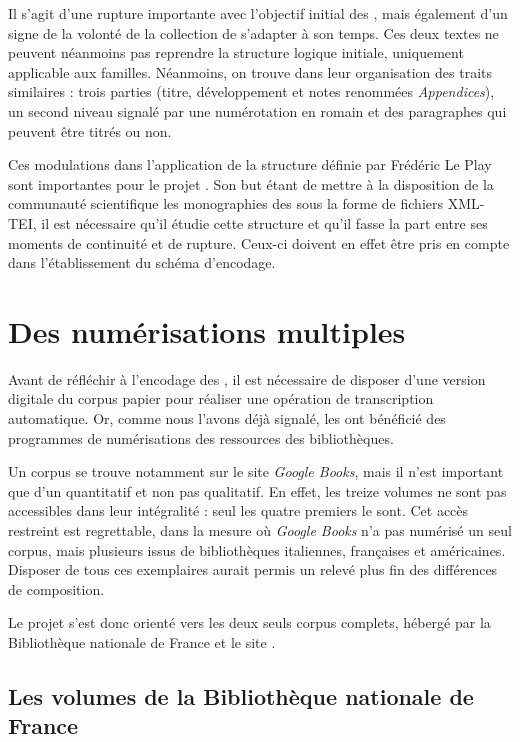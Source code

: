 Il s'agit d'une rupture importante avec l'objectif initial des \odm, mais également d'un signe de la volonté de la collection de s'adapter à son temps. Ces deux textes ne peuvent néanmoins pas reprendre la structure logique initiale, uniquement applicable aux familles. Néanmoins, on trouve dans leur organisation des traits similaires : trois parties (titre, développement et notes renommées \textit{Appendices}), un second niveau signalé par une numérotation en romain et des paragraphes qui peuvent être titrés ou non.

Ces modulations dans l'application de la structure définie par Frédéric Le Play sont importantes pour le projet \timeus. Son but étant de mettre à la disposition de la communauté scientifique les monographies des \odm{} sous la forme de fichiers XML-TEI, il est nécessaire qu'il étudie cette structure et qu'il fasse la part entre ses moments de continuité et de rupture. Ceux-ci doivent en effet être pris en compte dans l'établissement du schéma d'encodage.

\chapter{Des numérisations multiples}

Avant de réfléchir à l'encodage des \odm, il est nécessaire de disposer d'une version digitale du corpus \og papier \fg{} pour réaliser une opération de transcription automatique. Or, comme nous l'avons déjà signalé, les \odm{} ont bénéficié des programmes de numérisations des ressources des bibliothèques.

Un corpus se trouve notamment sur le site \textit{Google Books}, mais il n'est important que d'un \pov{} quantitatif et non pas qualitatif. En effet, les treize volumes ne sont pas accessibles dans leur intégralité : seul les quatre premiers le sont. Cet accès restreint est regrettable, dans la mesure où \textit{Google Books} n'a pas numérisé un seul corpus, mais plusieurs issus de bibliothèques italiennes, françaises et américaines. Disposer de tous ces exemplaires aurait permis un relevé plus fin des différences de composition.

Le projet \timeus s'est donc orienté vers les deux seuls corpus complets, hébergé par la Bibliothèque nationale de France et le site \ia.

\section{Les volumes de la Bibliothèque nationale de France}

